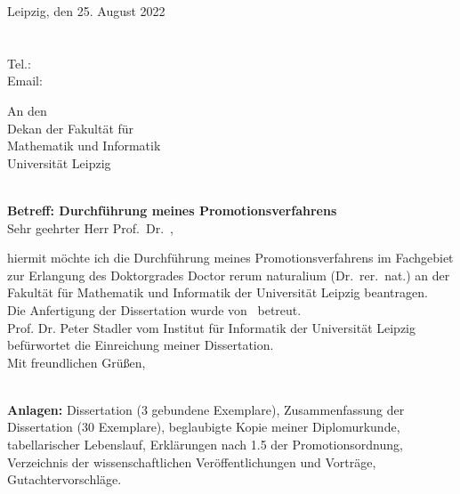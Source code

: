 \begin{flushleft}
\me        \hfill Leipzig, den 25. August 2022\\ 
\mystreet\\ 
\mycity \\
Tel.: \mytel \\
Email: \myemail

\end{flushleft}
\vspace*{0.2cm}
\begin{flushleft}
An den\\
Dekan der Fakult\"at f\"ur\\ 
Mathematik und Informatik\\
Universit\"at Leipzig\\
\facultystreet\\ 
\facultycity
\end{flushleft}

{\bf Betreff: Durchf\"uhrung meines Promotionsverfahrens}\\

Sehr geehrter Herr Prof.\ Dr.\ \thedean,

hiermit m\"ochte ich die Durchf\"uhrung meines Promotionsverfahrens im Fachgebiet \department zur Erlangung des Doktorgrades Doctor rerum naturalium (Dr.\ rer.\ nat.) an der Fakult\"at f\"ur Mathematik und Informatik der Universit\"at Leipzig beantragen. \\[.2cm]
Die Anfertigung der Dissertation wurde von \mysupervisor\ betreut. \\
Prof. Dr. Peter Stadler vom Institut für Informatik der Universität Leipzig befürwortet die Einreichung meiner Dissertation.\\
Mit freundlichen Gr\"u\ss en,
\vspace{2cm}

\me \\
 
{\bf Anlagen:} Dissertation (3 gebundene Exemplare), Zusammenfassung
der Dissertation (30 Exemplare), beglaubigte Kopie meiner Diplomurkunde,
tabellarischer Lebenslauf, Erkl\"arungen nach  1.5 der
Promotionsordnung, Verzeichnis der wissenschaftlichen Ver\"offentlichungen und Vortr\"age, Gutachtervorschl\"age.


